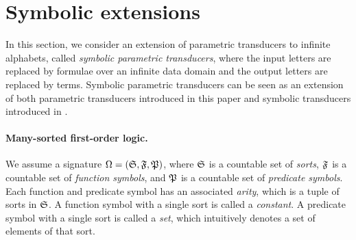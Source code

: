 
\section{Symbolic extensions}
\label{sec:symbolic}


In this section, we consider an extension of parametric transducers to infinite alphabets, called \emph{symbolic parametric transducers}, where the input letters are replaced by formulae over an infinite data domain and the output letters are replaced by terms. 
%
Symbolic parametric transducers can be seen as an extension of both parametric transducers introduced in this paper and symbolic transducers introduced in \cite{VHLMB12}.


\paragraph{Many-sorted first-order logic.}
We assume a signature $\Omega=({\mathfrak{S}}, {\mathfrak{F}}, {\mathfrak{P}})$, where ${\mathfrak{S}}$ is a countable set of \emph{sorts}, ${\mathfrak{F}}$ is a countable set of \emph{function symbols}, and ${\mathfrak{P}}$ is a countable set of \emph{predicate symbols}. Each function and predicate symbol has an associated \emph{arity}, which is a tuple of sorts in ${\mathfrak{S}}$.  A function symbol with a single sort is called a \emph{constant}. A predicate symbol with a single sort is called a \emph{set}, which intuitively denotes a set of elements of that sort.

